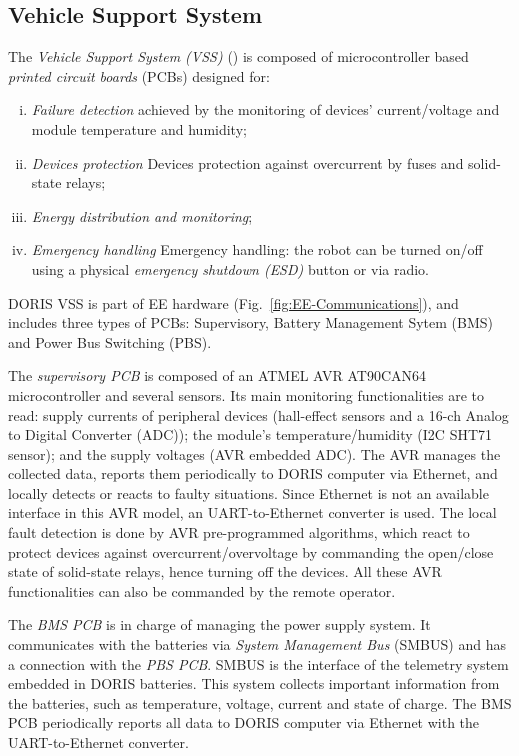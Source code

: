 \documentclass{ifacconf}
\begin{document}
\subsection{Vehicle Support System}\label{sec:VSS} 
The \emph{Vehicle Support System (VSS)} (\cite{MARIUS}) is composed of
microcontroller based \emph{printed circuit boards} (PCBs) designed for:

\begin{enumerate}[i)]
\item \emph{Failure detection} achieved by the monitoring of devices’
current/voltage and module temperature and humidity;
\item \emph{Devices protection} Devices protection against overcurrent by fuses and
solid-state relays;
\item \emph{Energy distribution and monitoring};
\item \emph{Emergency handling} Emergency handling: the robot can be turned on/off
using a physical \emph{emergency shutdown (ESD)} button
or via radio.
\end{enumerate}

DORIS VSS is part of EE hardware (Fig.~\ref{fig:EE-Communications}), and
includes three types of PCBs: Supervisory, Battery Management Sytem (BMS) and
Power Bus Switching (PBS).

The \emph{supervisory PCB} is composed of an ATMEL AVR AT90CAN64 microcontroller
and several sensors. Its main monitoring functionalities are to read: supply
currents of peripheral devices (hall-effect sensors and a 16-ch Analog to
Digital Converter (ADC)); the module’s temperature/humidity (I2C SHT71 sensor);
and the supply voltages (AVR embedded ADC). The AVR manages the collected data,
reports them periodically to DORIS computer via Ethernet, and locally detects or
reacts to faulty situations. Since Ethernet is not an available interface in
this AVR model, an UART-to-Ethernet converter is used. The local fault
detection is done by AVR pre-programmed algorithms, which react to protect
devices against overcurrent/overvoltage by commanding the open/close state of
solid-state relays, hence turning off the devices. All these AVR
functionalities can also be commanded by the remote operator.

The \emph{BMS PCB} is in charge of managing the power supply system. It
communicates with the batteries via \emph{System Management Bus} (SMBUS) and has
a connection with the \emph{PBS PCB}. SMBUS is the interface of the telemetry
system embedded in DORIS batteries. This system collects important information
from the batteries, such as temperature, voltage, current and state of charge.
The BMS PCB periodically reports all data to DORIS computer via Ethernet with
the UART-to-Ethernet converter.
\end{document}
